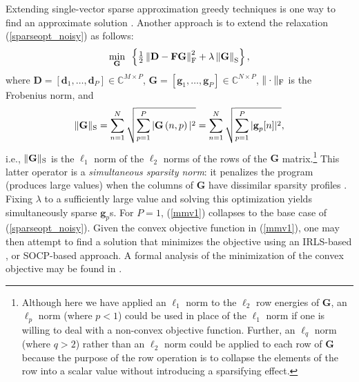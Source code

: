 \documentclass[final]{siamltex}
\newcommand{\field}[1]{\mathbb{#1}}
\newcommand{\la}[1]{\mbox{$\mathbf{#1}$}}  \newcommand{\sst}[1]{\mbox{\scriptsize{#1}}}
\begin{document}
   Extending single-vector sparse approximation greedy techniques is
   one way to find an approximate solution \cite{Cot2005,Tro2006_I}.
   Another approach is to extend the relaxation
   (\ref{sparseopt_noisy}) as follows:
   \begin{equation}\label{mmv1}
   \mathop{\mbox{min}}_{\mbox{\scriptsize{\la{G}}}} \mbox{  }
      \left \{
        \tfrac{1}{2}  \left \Vert \la{D} - \la{F} \la{G}
                      \right \Vert_{\mbox{\scriptsize{F}}}^2
       +     \lambda  \left \Vert \la{G} \right \Vert_{\mbox{\scriptsize{S}}}
      \right \},
   \end{equation}
   where $\la{D} = [ \la{d}_1, \ldots, \la{d}_P ] \in \field{C}^{M
   \times P}$, $\la{G} = [\la{g}_1, \ldots, \la{g}_P] \in \field{C}^{N
   \times P}$, $\Vert \cdot \Vert_{\mbox{\scriptsize{F}}}$ is the
   Frobenius norm, and
   \begin{equation}\label{S_norm}
     \Vert \la{G} \Vert_{\mbox{\scriptsize{S}}} 
        = \sum_{n=1}^{N}{ \sqrt{ \sum_{p=1}^{P}{ \vert \la{G}\left(n,p\right) \vert^2 }} } 
        = \sum_{n=1}^{N}{ \sqrt{ \sum_{p=1}^{P}{ \vert \la{g}_p[n] \vert^2 }} },
   \end{equation}
   i.e., $\Vert \la{G} \Vert_{\sst{S}}$ is the $\ell_1$ norm of the
   $\ell_2$ norms of the rows of the \la{G} matrix.\footnote{Although
   here we have applied an $\ell_1$ norm to the $\ell_2$ row energies
   of $\la{G}$, an $\ell_p$ norm (where $p < 1$) could be used in
   place of the $\ell_1$ norm if one is willing to deal with a
   non-convex objective function.  Further, an $\ell_q$ norm (where $q
   > 2$) rather than an $\ell_2$ norm could be applied to each row of
   $\la{G}$ because the purpose of the row operation is to collapse
   the elements of the row into a scalar value without introducing a
   sparsifying effect.} This latter operator is a {\em{simultaneous
   sparsity norm}}: it penalizes the program (produces large values)
   when the columns of \la{G} have dissimilar sparsity profiles
   \cite{Mal2005}.  Fixing $\lambda$ to a sufficiently large value and
   solving this optimization yields simultaneously sparse $\la{g}_p$s.
   For $P = 1$, (\ref{mmv1}) collapses to the base case of
   (\ref{sparseopt_noisy}).  Given the convex objective function in
   (\ref{mmv1}), one may then attempt to find a solution that
   minimizes the objective using an IRLS-based \cite{Cot2005}, or
   SOCP-based \cite{Mal2005} approach.  A formal analysis of the
   minimization of the convex objective may be found in
   \cite{Tro2006_II}.
\end{document}
